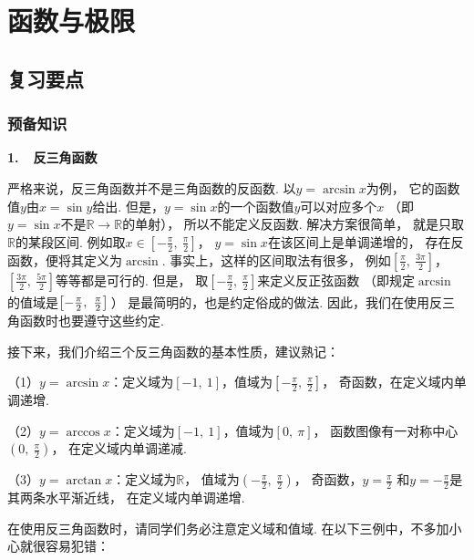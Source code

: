 \section{函数与极限}

\subsection{复习要点}

\subsubsection{预备知识}


\textbf{1.~~反三角函数}\vspace{0.5em}

严格来说，反三角函数并不是三角函数的反函数.
以$y=\arcsin x$为例，
它的函数值$y$由$x = \sin y$给出.
但是，$y = \sin x$的一个函数值$y$可以对应多个$x$
（即$y = \sin x$不是$\mathbb{R}\to \mathbb{R}$的单射），
所以不能定义反函数.
解决方案很简单，
就是只取$\mathbb{R}$的某段区间.
例如取$x \in \left[ -\frac{\pi}{2},~\frac{\pi}{2} \right] $，
$y = \sin x$在该区间上是单调递增的，
存在反函数，便将其定义为$\arcsin$.
事实上，这样的区间取法有很多，
例如$\left[ \frac{\pi}{2},~\frac{3\pi}{2} \right] $，
$\left[ \frac{3\pi}{2},~\frac{5\pi}{2} \right]$等等都是可行的.
但是，
取$\left[ -\frac{\pi}{2},~\frac{\pi}{2} \right] $来定义反正弦函数
（即规定$\arcsin$的值域是$\left[ -\frac{\pi}{2},~\frac{\pi}{2} \right] \vphantom{\frac{\frac{1}{1}}{1}}$）
是最简明的，也是约定俗成的做法.
因此，我们在使用反三角函数时也要遵守这些约定.

接下来，我们介绍三个反三角函数的基本性质，建议熟记：\vspace{0.5em}

（1）$y = \arcsin x$：定义域为$[-1,~1]$，值域为$\left[ -\frac{\pi}{2},~\frac{\pi}{2} \right]$，
奇函数，在定义域内单调递增.

（2）$y = \arccos x$：定义域为$[-1,~1]$，值域为$[0,~\pi]$，
函数图像有一对称中心$\left( 0,~\displaystyle\frac{\pi}{2} \right)$，
在定义域内单调递减.

（3）$y = \arctan x$：定义域为$\mathbb{R}$，
值域为$\left( -\frac{\pi}{2},~\frac{\pi}{2} \right)$，
奇函数，$y =\displaystyle\frac{\pi}{2}$
和$y =-\displaystyle\frac{\pi}{2}$是其两条水平渐近线，
在定义域内单调递增.\vspace{0.5em}

在使用反三角函数时，请同学们务必注意定义域和值域.
在以下三例中，不多加小心就很容易犯错：\vspace{0.5em}

